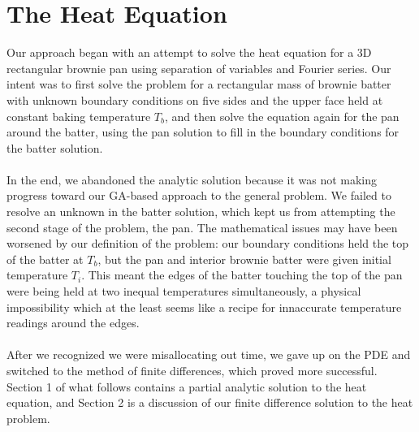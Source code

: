 \documentclass[12pt,draft]{reedmcm}
\begin{document}
\section{The Heat Equation}
Our approach began with an attempt to solve the heat equation for a 3D rectangular brownie pan using separation of variables and Fourier series.  Our intent was to first solve the problem for a rectangular mass of brownie batter with unknown boundary conditions on five sides and the upper face held at constant baking temperature $T_b$, and then solve the equation again for the pan around the batter, using the pan solution to fill in the boundary conditions for the batter solution.\\
\\
In the end, we abandoned the analytic solution because it was not making progress toward our GA-based approach to the general problem.  We failed to resolve an unknown in the batter solution, which kept us from attempting the second stage of the problem, the pan.  The mathematical issues may have been worsened by our definition of the problem: our boundary conditions held the top of the batter at $T_b$, but the pan and interior brownie batter were given initial temperature $T_i$.  This meant the edges of the batter touching the top of the pan were being held at two inequal temperatures simultaneously, a physical impossibility which at the least seems like a recipe for innaccurate temperature readings around the edges.\\
\\
After we recognized we were misallocating out time, we gave up on the PDE and switched to the method of finite differences, which proved more successful.  Section 1 of what follows contains a partial analytic solution to the heat equation, and Section 2 is a discussion of our finite difference solution to the heat problem.\\
\end{document}
